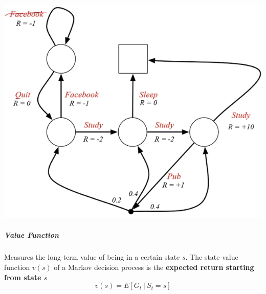 \documentclass[10pt]{report}
\begin{document}
\begin{center}
	\includegraphics[scale=0.5]{160.png}
\end{center}
\subparagraph{Value Function} Measures the long-term value of being in a certain state $s$. The state-value function $v(s)$ of a Markov decision process is the \textbf{expected return starting from state $s$}
$$v(s)=E[G_t\:|\:S_t=s]$$
\end{document}
